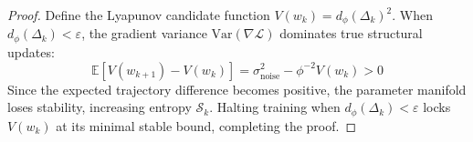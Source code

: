 \begin{proof}
Define the Lyapunov candidate function $V(w_k) = d_{\phi}(\Delta_k)^2$. When $d_{\phi}(\Delta_k) < \varepsilon$, the gradient variance $\text{Var}(\nabla \mathcal{L})$ dominates true structural updates:
\begin{equation}
\mathbb{E}[V(w_{k+1}) - V(w_k)] = \sigma_{\text{noise}}^2 - \phi^{-2} V(w_k) > 0
\end{equation}
Since the expected trajectory difference becomes positive, the parameter manifold loses stability, increasing entropy $\mathcal{S}_k$. Halting training when $d_{\phi}(\Delta_k) < \varepsilon$ locks $V(w_k)$ at its minimal stable bound, completing the proof.
\end{proof}
